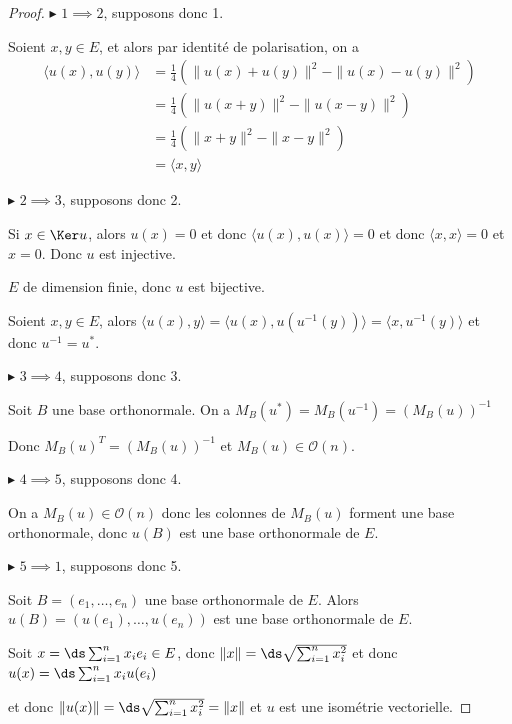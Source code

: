 \begin{proof}
    $\blacktriangleright$ $1 \implies 2$, supposons donc 1. 

    Soient $x, y \in E$, et alors par identité de polarisation, on a 
    \begin{align}
        \langle u(x), u(y) \rangle & = \frac 1 4 \left( \| u(x) + u(y) \|^2 - \| u(x) - u(y) \|^2 \right) \\
        & = \frac 1 4 \left( \| u(x + y) \|^2 - \| u(x - y) \|^2 \right) \\
        & = \frac 1 4 \left( \| x + y \|^2 - \| x - y \|^2 \right) \\
        & = \langle x, y \rangle
    \end{align}

    \avspace $\blacktriangleright$ $2 \implies 3$, supposons donc 2.

    Si $x \in \Ker u$, alors $u(x) = 0$ et donc $\langle u(x), u(x) \rangle = 0$ et donc 
    $\langle x, x \rangle = 0$ et $x = 0$. Donc $u$ est injective.

    $E$ de dimension finie, donc $u$ est bijective.

    \avspace Soient $x, y \in E$, alors $\langle u(x), y \rangle = \langle u(x), u(u^{-1}(y)) \rangle = \langle x, u^{-1}(y) \rangle$ 
    et donc $u^{-1} = u^*$.
    
    \avspace $\blacktriangleright$ $3 \implies 4$, supposons donc 3.

    Soit $B$ une base orthonormale. On a $M_B(u^*) = M_B(u^{-1}) = (M_B(u))^{-1}$ 

    Donc $M_B(u)^T = (M_B(u))^{-1}$ et $M_B(u) \in \mathcal O(n)$.

    \avspace $\blacktriangleright$ $4 \implies 5$, supposons donc 4.

    On a $M_B(u) \in \mathcal O(n)$ donc les colonnes de $M_B(u)$ forment une base orthonormale, 
    donc $u(B)$ est une base orthonormale de $E$.

    \avspace $\blacktriangleright$ $5 \implies 1$, supposons donc 5.

    Soit $B = (e_1, \dots, e_n)$ une base orthonormale de $E$. Alors $u(B) = (u(e_1), \dots, u(e_n))$ est une base orthonormale de $E$.

    Soit $x = \ds \sum_{i = 1}^{n } x_i e_i \in E$, donc $\|x\| = \ds \sqrt{\sum_{i = 1}^n x_i^2}$ 
    et donc $u(x) = \ds \sum_{i = 1}^{n } x_i u(e_i)$ 

    et donc $\| u(x) \| = \ds \sqrt{\sum_{i = 1}^n x_i^2} = \| x \|$ et $u$ est une isométrie vectorielle.
\end{proof}

